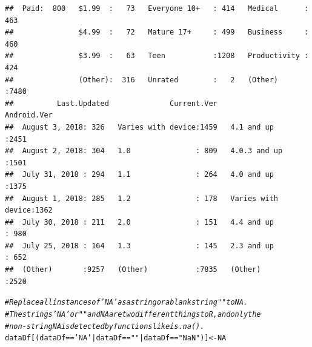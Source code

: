 \documentclass[12pt]{report}\usepackage[]{graphicx}\usepackage[]{xcolor}
\makeatletter
\newcommand{\hlnum}[1]{\textcolor[rgb]{0.686,0.059,0.569}{#1}}%
\newcommand{\hlstr}[1]{\textcolor[rgb]{0.192,0.494,0.8}{#1}}%
\newcommand{\hlcom}[1]{\textcolor[rgb]{0.678,0.584,0.686}{\textit{#1}}}%
\newcommand{\hlopt}[1]{\textcolor[rgb]{0,0,0}{#1}}%
\newcommand{\hlstd}[1]{\textcolor[rgb]{0.345,0.345,0.345}{#1}}%
\newcommand{\hlkwb}[1]{\textcolor[rgb]{0.69,0.353,0.396}{#1}}%
\newenvironment{kframe}{%
 \def\at@end@of@kframe{}%
 \ifinner\ifhmode%
  \def\at@end@of@kframe{\end{minipage}}%
  \begin{minipage}{\columnwidth}%
 \fi\fi%
 \def\FrameCommand##1{\hskip\@totalleftmargin \hskip-\fboxsep
 \colorbox{shadecolor}{##1}\hskip-\fboxsep
     \hskip-\linewidth \hskip-\@totalleftmargin \hskip\columnwidth}%
 \MakeFramed {\advance\hsize-\width
   \@totalleftmargin\z@ \linewidth\hsize
   \@setminipage}}%
 {\par\unskip\endMakeFramed%
 \at@end@of@kframe}
\newenvironment{knitrout}{}{} %
\makeatother
\begin{document}
\begin{knitrout}
\begin{kframe}
\begin{verbatim}
##  Paid:  800   $1.99  :   73   Everyone 10+   : 414   Medical      : 463  
##               $4.99  :   72   Mature 17+     : 499   Business     : 460  
##               $3.99  :   63   Teen           :1208   Productivity : 424  
##               (Other):  316   Unrated        :   2   (Other)      :7480  
##          Last.Updated              Current.Ver               Android.Ver  
##  August 3, 2018: 326   Varies with device:1459   4.1 and up        :2451  
##  August 2, 2018: 304   1.0               : 809   4.0.3 and up      :1501  
##  July 31, 2018 : 294   1.1               : 264   4.0 and up        :1375  
##  August 1, 2018: 285   1.2               : 178   Varies with device:1362  
##  July 30, 2018 : 211   2.0               : 151   4.4 and up        : 980  
##  July 25, 2018 : 164   1.3               : 145   2.3 and up        : 652  
##  (Other)       :9257   (Other)           :7835   (Other)           :2520
\end{verbatim}
\begin{alltt}
\hlcom{# Replace all instances of 'NA' as a string or a blank string "" to NA.}
\hlcom{# The strings 'NA' or " " and NA are two different things to R, and only the}
\hlcom{# non-string NA is detected by functions like is.na().}
\hlstd{dataDf[(dataDf} \hlopt{==} \hlstr{'NA'} \hlopt{|} \hlstd{dataDf} \hlopt{==} \hlstr{""} \hlopt{|} \hlstd{dataDf} \hlopt{==} \hlstr{"NaN"}\hlstd{)]} \hlkwb{<-} \hlnum{NA}


\end{alltt}
\end{kframe}
\end{knitrout}
\end{document}
